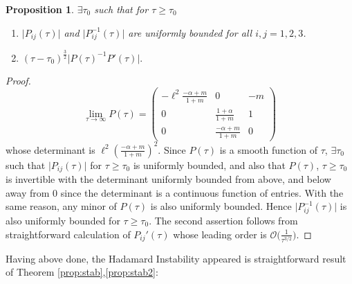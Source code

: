 \documentclass[a4paper,11pt]{article}
\def\l{{\ell}}
\newtheorem{proposition}{Proposition}[section]
\theoremstyle{remark}
\begin{document}
\begin{proposition} \label{prop:factor}$\exists \tau_0$ such that for $\tau\ge\tau_0$
 \begin{enumerate}
  \item  $\big|P_{ij}(\tau)\big|$ and $\big|P^{-1}_{ij}(\tau)\big|$ are uniformly bounded for all $i,j=1,2,3$.
  \item $(\tau-\tau_0)^{\tfrac{3}{2}} \big|P(\tau)^{-1}P'(\tau)\big|.$ %
 \end{enumerate}
\end{proposition}
\begin{proof}
$$ \lim_{\tau \rightarrow \infty} P(\tau) = \begin{pmatrix} -\l^2\frac{-\alpha+m}{1+m}& 0 & -m\\ 0 & \frac{1+\alpha}{1+m} & 1\\ 0 & \frac{-\alpha+m}{1+m} & 0\end{pmatrix}$$
whose determinant is $\l^2 \left(\frac{-\alpha+m}{1+m}\right)^2$. Since $P(\tau)$ is a smooth function of $\tau$, $\exists \tau_0$ such that $\big|P_{ij}(\tau)\big|$ for $\tau\ge\tau_0$ is uniformly bounded, and also that $P(\tau)$, $\tau\ge\tau_0$ is invertible with the determinant uniformly bounded from above, and below away from $0$ since the determinant is a continuous function of entries. With the same reason, any minor of $P(\tau)$ is also uniformly bounded. Hence $\big|P^{-1}_{ij}(\tau)\big|$ is also uniformly bounded for $\tau\ge \tau_0$. The second assertion follows from straightforward calculation of $P_{ij}'(\tau)$ whose leading order is $\mathcal{O}\big(\frac{1}{\tau^{3/2}}\big)$.
\end{proof}
Having above done, the Hadamard Instability appeared is straightforward result of Theorem \ref{prop:stab},\ref{prop:stab2}:
\end{document}
